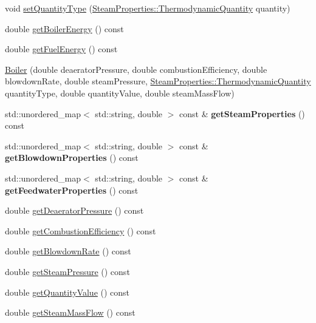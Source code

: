 \begin{DoxyCompactItemize}
\item 
void \hyperlink{class_boiler_a9c5b20cae6133c9174b12760f36d52c2}{set\+Quantity\+Type} (\hyperlink{class_steam_properties_ae0294bedf7d178c2d8fb6aed0f62fbff}{Steam\+Properties\+::\+Thermodynamic\+Quantity} quantity)
\item 
double \hyperlink{class_boiler_a8cc9ad5f1b36f5dcbcb225e9e3d13a39}{get\+Boiler\+Energy} () const
\item 
double \hyperlink{class_boiler_a55542a761669c842163b20932f9747d3}{get\+Fuel\+Energy} () const
\item 
\hyperlink{class_boiler_adebe1dca06edc8dbca462e226b4dd9d5}{Boiler} (double deaerator\+Pressure, double combustion\+Efficiency, double blowdown\+Rate, double steam\+Pressure, \hyperlink{class_steam_properties_ae0294bedf7d178c2d8fb6aed0f62fbff}{Steam\+Properties\+::\+Thermodynamic\+Quantity} quantity\+Type, double quantity\+Value, double steam\+Mass\+Flow)
\item 
\mbox{\label{class_boiler_a432ff9b941a9fd3a36dc2c58bbb1fc60}} 
std\+::unordered\+\_\+map$<$ std\+::string, double $>$ const  \& {\bfseries get\+Steam\+Properties} () const
\item 
\mbox{\label{class_boiler_ac561af37c8c6d2f93cd4e38e8de9b8eb}} 
std\+::unordered\+\_\+map$<$ std\+::string, double $>$ const  \& {\bfseries get\+Blowdown\+Properties} () const
\item 
\mbox{\label{class_boiler_a7cf302e46f9128f7042928d51d094e50}} 
std\+::unordered\+\_\+map$<$ std\+::string, double $>$ const  \& {\bfseries get\+Feedwater\+Properties} () const
\item 
double \hyperlink{class_boiler_aad4786e7b68084e65a35dd6235517b8c}{get\+Deaerator\+Pressure} () const
\item 
double \hyperlink{class_boiler_a21c7423b756761c3216704b3f554feff}{get\+Combustion\+Efficiency} () const
\item 
double \hyperlink{class_boiler_aec9bf6eeed82d8d5f35284c65a3986e7}{get\+Blowdown\+Rate} () const
\item 
double \hyperlink{class_boiler_a99d4bbace6ef20bcbdc4b0cfcdc43213}{get\+Steam\+Pressure} () const
\item 
double \hyperlink{class_boiler_a78370a174135e6cc95abcd3b7ac2f947}{get\+Quantity\+Value} () const
\item 
double \hyperlink{class_boiler_a4101e71234995558a451dcab145b5fc9}{get\+Steam\+Mass\+Flow} () const

\end{DoxyCompactItemize}
